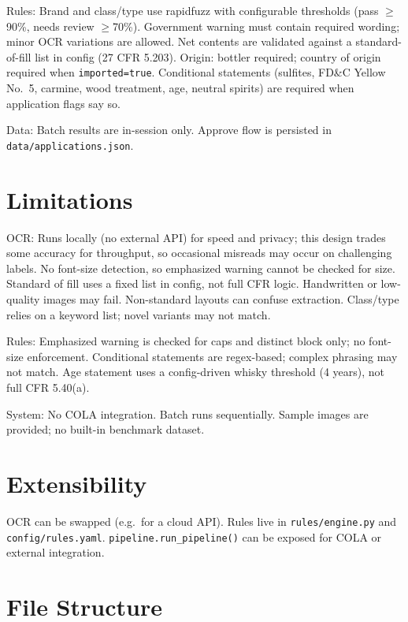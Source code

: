 \documentclass[11pt,a4paper]{article}
\begin{document}
Rules: Brand and class/type use rapidfuzz with configurable thresholds (pass $\geq$90\%, needs review $\geq$70\%). Government warning must contain required wording; minor OCR variations are allowed. Net contents are validated against a standard-of-fill list in config (27 CFR 5.203). Origin: bottler required; country of origin required when \texttt{imported=true}. Conditional statements (sulfites, FD\&C Yellow No.\ 5, carmine, wood treatment, age, neutral spirits) are required when application flags say so.

Data: Batch results are in-session only. Approve flow is persisted in \texttt{data/applications.json}.

\section{Limitations}

OCR: Runs locally (no external API) for speed and privacy; this design trades some accuracy for throughput, so occasional misreads may occur on challenging labels. No font-size detection, so emphasized warning cannot be checked for size. Standard of fill uses a fixed list in config, not full CFR logic. Handwritten or low-quality images may fail. Non-standard layouts can confuse extraction. Class/type relies on a keyword list; novel variants may not match.

Rules: Emphasized warning is checked for caps and distinct block only; no font-size enforcement. Conditional statements are regex-based; complex phrasing may not match. Age statement uses a config-driven whisky threshold (4 years), not full CFR 5.40(a).

System: No COLA integration. Batch runs sequentially. Sample images are provided; no built-in benchmark dataset.

\section{Extensibility}

OCR can be swapped (e.g.\ for a cloud API). Rules live in \texttt{rules/engine.py} and \texttt{config/rules.yaml}. \texttt{pipeline.run\_pipeline()} can be exposed for COLA or external integration.

\section{File Structure}
\end{document}
